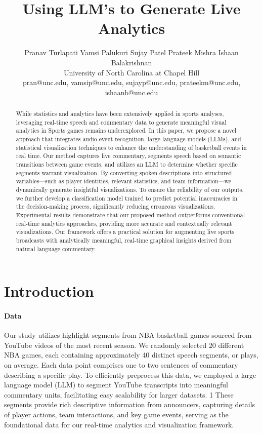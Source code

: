 \documentclass{article}
\title{Using LLM's to Generate Live Analytics}
\author{
  Pranav Turlapati \quad
  Vamsi Palukuri \quad
  Sujay Patel \quad
  Prateek Mishra \quad
  Ishaan Balakrishnan \\
  University of North Carolina at Chapel Hill \\
  pran@unc.edu, vamsip@unc.edu, sujayp@unc.edu, prateekm@unc.edu, ishaanb@unc.edu
}
\begin{document}
\maketitle


\begin{abstract}
  While statistics and analytics have been extensively applied in sports analyses, leveraging real-time speech and commentary data to generate meaningful visual analytics in Sports games remains underexplored. In this paper, we propose a novel approach that integrates audio event recognition, large language models (LLMs), and statistical visualization techniques to enhance the understanding of basketball events in real time. Our method captures live commentary, segments speech based on semantic transitions between game events, and utilizes an LLM to determine whether specific segments warrant visualization. By converting spoken descriptions into structured variables—such as player identities, relevant statistics, and team information—we dynamically generate insightful visualizations. To ensure the reliability of our outputs, we further develop a classification model trained to predict potential inaccuracies in the decision-making process, significantly reducing erroneous visualizations. Experimental results demonstrate that our proposed method outperforms conventional real-time analytics approaches, providing more accurate and contextually relevant visualizations. Our framework offers a practical solution for augmenting live sports broadcasts with analytically meaningful, real-time graphical insights derived from natural language commentary.

\end{abstract}


\section{Introduction}

\paragraph{Data}

Our study utilizes highlight segments from NBA basketball games sourced from YouTube
videos of the most recent season. We randomly selected 20 different NBA games, each
containing approximately 40 distinct speech segments, or plays, on average. Each data
point comprises one to two sentences of commentary describing a specific play. To efficiently
preprocess this data, we employed a large language model (LLM) to segment YouTube
transcripts into meaningful commentary units, facilitating easy scalability for larger datasets.
1
These segments provide rich descriptive information from announcers, capturing details of
player actions, team interactions, and key game events, serving as the foundational data for
our real-time analytics and visualization framework.
\end{document}
